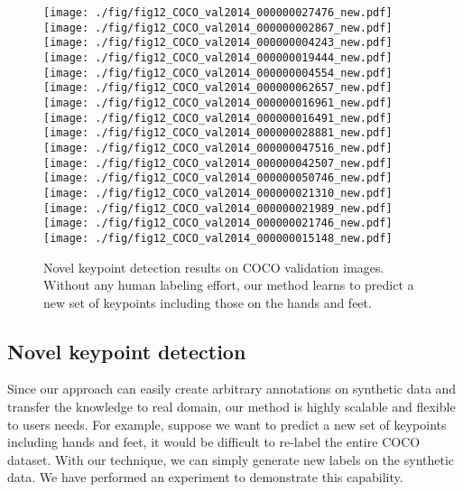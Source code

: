 \documentclass[final]{IEEEtran}
\begin{document}
{\begin{minipage}{\textwidth}
 
\begin{figure*}[tb]
 \centering
    \texttt{[image: ./fig/fig12\_COCO\_val2014\_000000027476\_new.pdf]}
 	\texttt{[image: ./fig/fig12\_COCO\_val2014\_000000002867\_new.pdf]}
 	\texttt{[image: ./fig/fig12\_COCO\_val2014\_000000004243\_new.pdf]}
 	\texttt{[image: ./fig/fig12\_COCO\_val2014\_000000019444\_new.pdf]}
 	\texttt{[image: ./fig/fig12\_COCO\_val2014\_000000004554\_new.pdf]}
 	\texttt{[image: ./fig/fig12\_COCO\_val2014\_000000062657\_new.pdf]}\\
 	\texttt{[image: ./fig/fig12\_COCO\_val2014\_000000016961\_new.pdf]}
 	\texttt{[image: ./fig/fig12\_COCO\_val2014\_000000016491\_new.pdf]}
 	\texttt{[image: ./fig/fig12\_COCO\_val2014\_000000028881\_new.pdf]}
 	\texttt{[image: ./fig/fig12\_COCO\_val2014\_000000047516\_new.pdf]}
 	\texttt{[image: ./fig/fig12\_COCO\_val2014\_000000042507\_new.pdf]}\\
 	\texttt{[image: ./fig/fig12\_COCO\_val2014\_000000050746\_new.pdf]}
    \texttt{[image: ./fig/fig12\_COCO\_val2014\_000000021310\_new.pdf]}
 	\texttt{[image: ./fig/fig12\_COCO\_val2014\_000000021989\_new.pdf]}
 	\texttt{[image: ./fig/fig12\_COCO\_val2014\_000000021746\_new.pdf]}
 	\texttt{[image: ./fig/fig12\_COCO\_val2014\_000000015148\_new.pdf]}\\
\caption{Novel keypoint detection results on COCO validation images. Without any human labeling effort, our method learns to predict a new set of keypoints including those on the hands and feet.}
\label{fig:addition-kpts} \end{figure*}


\subsection{Novel keypoint detection}
\label{sec:novelkey}
Since our approach can easily create arbitrary annotations on synthetic data and transfer the knowledge to real domain, our method is highly scalable and flexible to users needs. For example, suppose we want to predict a new set of keypoints including hands and feet, it would be difficult to re-label the entire COCO dataset. With our technique, we can simply generate new labels on the synthetic data. We have performed an experiment to demonstrate this capability.



\end{minipage}}
\end{document}
